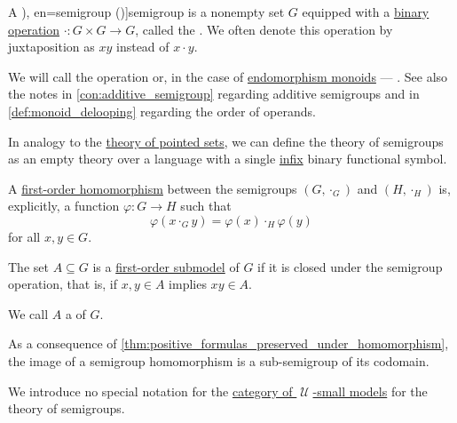 \begin{definition}\label{def:semigroup}
  A \term[ru=полугруппа (\cite[28]{Ляпин1960Полугруппы}), en=semigroup (\cite[144]{MacLane1998CategoryTheory})]{semigroup} is a nonempty set \( G \) equipped with a \hyperref[def:operation_arity_terminology]{binary} \hyperref[def:operation_on_set]{operation} \( \cdot: G \times G \to G \), called the . We often denote this operation by juxtaposition as \( xy \) instead of \( x \cdot y \).

  We will call the operation  or, in the case of \hyperref[def:endomorphism_monoid]{endomorphism monoids} --- . See also the notes in \cref{con:additive_semigroup} regarding additive semigroups and in \cref{def:monoid_delooping} regarding the order of operands.

  \begin{thmenum}[series=def:semigroup]
    \mimprovised In analogy to the \hyperref[def:pointed_set/theory]{theory of pointed sets}, we can define the theory of semigroups as an empty theory over a language with a single \hyperref[rem:first_order_formula_conventions/infix]{infix} binary functional symbol.

     A \hyperref[def:first_order_homomorphism]{first-order homomorphism} between the semigroups \( (G, \cdot_{G}) \) and \( (H, \cdot_{H}) \) is, explicitly, a function \( \varphi: G \to H \) such that
    \begin{equation}\label{eq:def:semigroup/homomorphism}
      \varphi(x \cdot_{G} y) = \varphi(x) \cdot_{H} \varphi(y)
    \end{equation}
    for all \( x, y \in G \).

     The set \( A \subseteq G \) is a \hyperref[def:first_order_substructure]{first-order submodel} of \( G \) if it is closed under the semigroup operation, that is, if \( x, y \in A \) implies \( xy \in A \).

    We call \( A \) a  of \( G \).

    As a consequence of \cref{thm:positive_formulas_preserved_under_homomorphism}, the image of a semigroup homomorphism is a sub-semigroup of its codomain.

    \mimprovised We introduce no special notation for the \hyperref[def:category_of_small_first_order_models]{category of \( \mscrU \)-small models} for the theory of semigroups.


\end{thmenum}
\end{definition}
